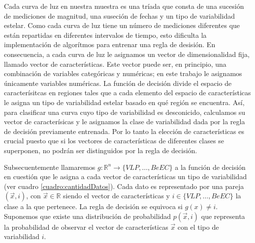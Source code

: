 \documentclass[letterpaper,12pt]{book}
\begin{document}
Cada curva de luz en nuestra muestra es una tríada que consta de una sucesión de mediciones de magnitud, una suseción de fechas y un tipo de variabilidad estelar. Como cada curva de luz tiene un número de mediciones diferentes que están repartidas en diferentes intervalos de tiempo, esto dificulta la implementación de algorítmos para entrenar una regla de desisión. En consecuencia, a cada curva de luz le asignamos un vector de dimensionalidad fija, llamado vector de características. Este vector puede ser, en principio, una combinación de variables categóricas y numéricas; en este trabajo le asignamos únicamente variables numéricas. La función de decisión divide el espacio de caracterísitcas en regiones tales que a cada elemento del espacio de características le asigna un tipo de variabilidad estelar basado en qué región se encuentra. Así, para clasificar una curva cuyo tipo de variabilidad es desconicido, calculamos su vector de caracterísicas y le asignamos la clase de variabilidad dada por la regla de decisión previamente entrenada. Por lo tanto la elección de características es crucial puesto que si los vectores de características de diferentes clases se superponen, no podrán ser distinguidos por la regla de decisión.

Subsecuentemente llamaremos $g:\mathbb{R}^{n}\rightarrow \{VLP,\dots, BeEC\}$ a la función de decisión en cuestión que le asigna a cada vector de características un tipo de variabilidad (ver cuadro \ref{cuadro:cantidadDatos}). Cada dato es representado por una pareja $(\vec{x}, i)$, con $\vec{x}\in\mathbb{R}$ siendo el vector de características y $i\in\{VLP,\dots, BeEC\}$ la clase a la que pertenece. La regla de decisión se equivoca si  $g(x)\neq i$. Suponemos que existe una distribución de probabilidad $p(\vec{x},i)$ que representa la probabilidad de observar el vector de características $\vec{x}$ con el tipo de variabilidad $i$.
\end{document}
